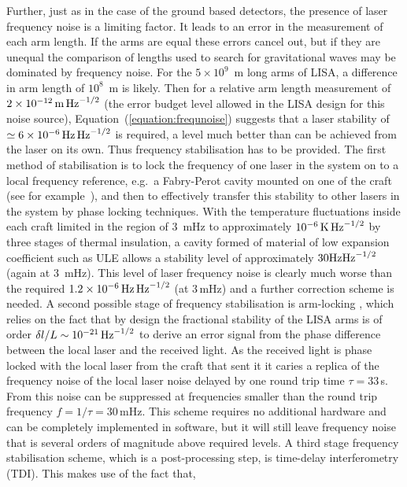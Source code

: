 \documentclass{article}
\begin{document}
Further, just as in the case of the ground based detectors, the presence of
laser frequency noise is a limiting factor. It leads to an error in the
measurement of each arm length. If the arms are equal these errors cancel out,
but if they are unequal the comparison of lengths used to search for
gravitational waves may be dominated by frequency noise. For the
$5\times10^9$~m long arms of LISA, a difference in arm length of $10^8$~m is 
likely. Then for a relative arm length measurement of $2 \times 10^{-12}\,{\rm
m}\,{\rm Hz}^{-1/2}$ (the error budget level allowed in the LISA design for this
noise source), Equation~(\ref{equation:frequnoise}) suggests that a laser
stability of $\simeq 6 \times 10^{-6}\,{\rm Hz}\,{\rm Hz}^{-1/2}$ is required, a
level much better than can be achieved from the laser on its own. Thus frequency
stabilisation has to be provided. The first method of stabilisation is to lock
the frequency of one laser in the system on to a local frequency reference, 
e.g.\ a Fabry-Perot cavity mounted on one of the craft (see for
example~\cite{McNamara}), and then to effectively transfer this stability to
other lasers in the system by phase locking techniques. With the temperature
fluctuations inside each craft limited in the region of 3~mHz to
approximately $10^{-6}\,{\rm K}\,{\rm Hz}^{-1/2}$ by three stages of thermal
insulation, a cavity formed of material of low expansion coefficient such as ULE
allows a stability level of approximately $30 {\rm Hz}{\rm Hz}^{-1/2}$ (again
at 3~mHz). This level of laser frequency noise is clearly much worse than the
required $1.2 \times 10^{-6}\,{\rm Hz}\,{\rm Hz}^{-1/2}$ (at 3\,mHz) and a
further correction scheme is needed. A second possible stage of frequency
stabilisation is arm-locking \cite{Sheard:2003}, which relies on the fact that
by design the fractional stability of the LISA arms is of order $\delta{}l/L
\sim 10^{-21}\,{\rm Hz}^{-1/2}$ to derive an error signal from the phase 
difference between the local laser and the received light. As the received light
is phase locked with the local laser from the craft that sent it it caries a
replica of the frequency noise of the local laser noise delayed by one round
trip time $\tau=33$\,s. From this noise can be suppressed at frequencies smaller
than the round trip frequency $f= 1/\tau = 30$\,mHz. This scheme requires no
additional hardware and can be completely implemented in software, but it will
still leave frequency noise that is several orders of magnitude above required
levels. A third stage frequency stabilisation scheme, which is a post-processing
step, is time-delay interferometry (TDI). This makes use of the fact that,
\end{document}
